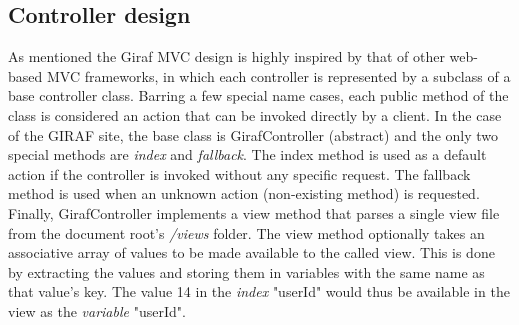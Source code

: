 \subsection{Controller design}
\label{controller_design}
As mentioned the Giraf MVC design is highly inspired by that of other web-based MVC frameworks, in which each controller is represented by a subclass of a base controller class. Barring a few special name cases, each public method of the class is considered an action that can be invoked directly by a client.
In the case of the GIRAF site, the base class is GirafController (abstract) and the only two special methods are \emph{index} and \emph{fallback}. The index method is used as a default action if the controller is invoked without any specific request. The fallback method is used when an unknown action (non-existing method) is requested.
Finally, GirafController implements a view method that parses a single view file from the document root's \emph{/views} folder. The view method optionally takes an associative array of values to be made available to the called view. This is done by extracting the values and storing them in variables with the same name as that value's key. The value 14 in the \emph{index} "userId" would thus be available in the view as the \emph{variable} "userId".

